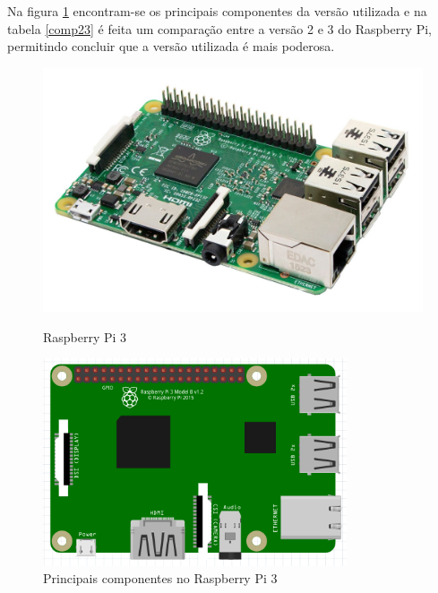  Na figura \ref{comprasp1} encontram-se os principais componentes da versão utilizada e na tabela \ref{comp23} é feita um comparação entre a versão 2 e 3 do Raspberry Pi, permitindo concluir que a versão utilizada é mais poderosa. 



\begin{figure}[h]
	\centering
	\begin{minipage}[b]{0.49\textwidth}
		\centering
		\includegraphics[width=\textwidth]{img/hardware/rasp3-img.jpg}
		\caption{Raspberry Pi 3}
		\label{rasp1}
	\end{minipage}
	\hfill
	\begin{minipage}[b]{0.49\textwidth}
		\centering
		\includegraphics[width=0.8\textwidth]{img/hardware/rasp-esquema.PNG}
		\caption{Principais componentes no Raspberry Pi 3 }
		\label{comprasp1}
		
	\end{minipage}
\end{figure}


\newpage

